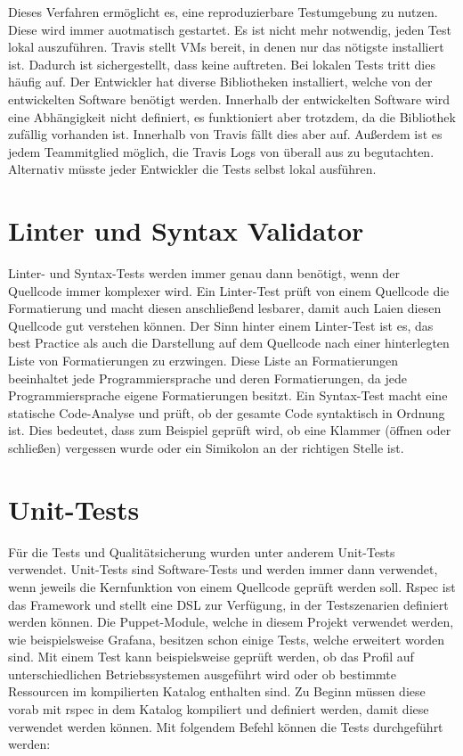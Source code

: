 Dieses Verfahren ermöglicht es, eine reproduzierbare Testumgebung zu nutzen.
Diese wird immer auotmatisch gestartet. Es ist nicht mehr notwendig, jeden Test
lokal auszuführen. Travis stellt VMs bereit, in denen nur das nötigste
installiert ist. Dadurch ist sichergestellt, dass keine  auftreten. Bei lokalen Tests tritt dies häufig auf. Der
Entwickler hat diverse Bibliotheken installiert, welche von der entwickelten
Software benötigt werden. Innerhalb der entwickelten Software wird eine
Abhängigkeit nicht definiert, es funktioniert aber trotzdem, da die Bibliothek
zufällig vorhanden ist. Innerhalb von Travis fällt dies aber auf. Außerdem ist
es jedem Teammitglied möglich, die Travis Logs von überall aus zu begutachten.
Alternativ müsste jeder Entwickler die Tests selbst lokal ausführen.
\tm%

\section{Linter und Syntax Validator}
Linter- und Syntax\hyp{}Tests werden immer genau dann benötigt, wenn der
Quellcode immer komplexer wird. Ein Linter\hyp{}Test prüft von einem Quellcode
die Formatierung und macht diesen anschließend lesbarer, damit auch Laien
diesen Quellcode gut verstehen können. Der Sinn hinter einem Linter\hyp{}Test
ist es, das best Practice als auch die Darstellung auf dem Quellcode nach einer
hinterlegten Liste von Formatierungen zu erzwingen. Diese Liste an
Formatierungen beeinhaltet jede Programmiersprache und deren Formatierungen, da
jede Programmiersprache eigene Formatierungen besitzt. Ein Syntax\hyp{}Test
macht eine statische Code\hyp{}Analyse und prüft, ob der gesamte Code
syntaktisch in Ordnung ist. Dies bedeutet, dass zum Beispiel geprüft wird, ob
eine Klammer (öffnen oder schließen) vergessen wurde oder ein Simikolon an der
richtigen Stelle ist.
\mr%

\section{Unit-Tests}
\label{sec:unit_tests}
Für die Tests und Qualitätsicherung wurden unter anderem Unit\hyp{}Tests
verwendet. Unit\hyp{}Tests sind Software\hyp{}Tests und werden immer dann
verwendet, wenn jeweils die Kernfunktion von einem Quellcode geprüft werden
soll. Rspec ist das Framework und stellt eine \gls{DSL} zur Verfügung, in der
Testszenarien definiert werden können. Die Puppet\hyp{}Module, welche in diesem
Projekt verwendet werden, wie beispielsweise Grafana, besitzen schon einige
Tests, welche erweitert worden sind. Mit einem Test kann beispielsweise geprüft
werden, ob das Profil auf unterschiedlichen Betriebssystemen ausgeführt wird
oder ob bestimmte Ressourcen im kompilierten Katalog enthalten sind. Zu Beginn
müssen diese vorab mit rspec in dem Katalog kompiliert und definiert werden,
damit diese verwendet werden können. Mit folgendem Befehl können die Tests
durchgeführt werden:

